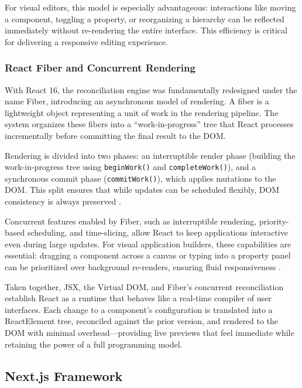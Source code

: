 \documentclass[oneside,12pt]{book}
\begin{document}
For visual editors, this model is especially advantageous: interactions like moving a component, toggling a property, or reorganizing a hierarchy can be reflected immediately without re-rendering the entire interface. This efficiency is critical for delivering a responsive editing experience.

\subsubsection{React Fiber and Concurrent Rendering}

With React 16, the reconciliation engine was fundamentally redesigned under the name Fiber, introducing an asynchronous model of rendering. A fiber is a lightweight object representing a unit of work in the rendering pipeline. The system organizes these fibers into a “work-in-progress” tree that React processes incrementally before committing the final result to the DOM.  

Rendering is divided into two phases: an interruptible render phase (building the work-in-progress tree using \texttt{beginWork()} and \texttt{completeWork()}), and a synchronous commit phase (\texttt{commitWork()}), which applies mutations to the DOM. This split ensures that while updates can be scheduled flexibly, DOM consistency is always preserved \cite{react_fiber_explained, react_fiber_architecture}.  

Concurrent features enabled by Fiber, such as interruptible rendering, priority-based scheduling, and time-slicing, allow React to keep applications interactive even during large updates. For visual application builders, these capabilities are essential: dragging a component across a canvas or typing into a property panel can be prioritized over background re-renders, ensuring fluid responsiveness \cite{react_fiber_concurrent, cooper2021fiber}.  

Taken together, JSX, the Virtual DOM, and Fiber’s concurrent reconciliation establish React as a runtime that behaves like a real-time compiler of user interfaces. Each change to a component’s configuration is translated into a ReactElement tree, reconciled against the prior version, and rendered to the DOM with minimal overhead—providing live previews that feel immediate while retaining the power of a full programming model.


\subsection{Next.js Framework}
\end{document}
